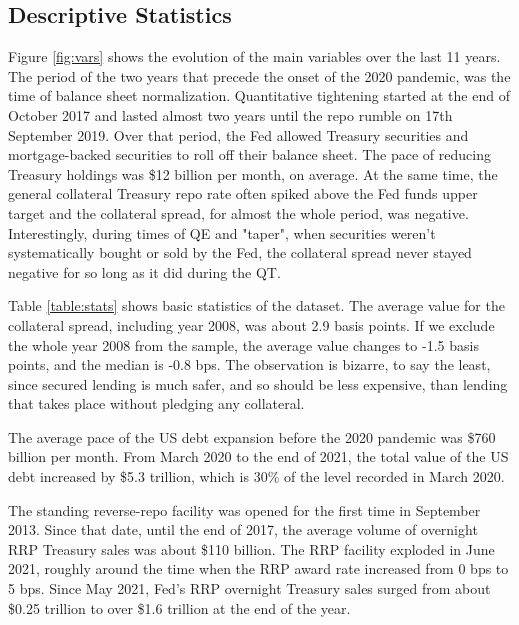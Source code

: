 \documentclass[11pt,a4paper,english,oneside]{article}
\begin{document}
\subsection{Descriptive Statistics} \label{sec:stats}

Figure \ref{fig:vars} shows the evolution of the main variables over the last 11 years. The period of the two years that precede the onset of the 2020 pandemic, was the time of balance sheet normalization. Quantitative tightening started at the end of October 2017 and lasted almost two years until the repo rumble on 17th September 2019. Over that period, the Fed allowed Treasury securities and mortgage-backed securities to roll off their balance sheet. The pace of reducing Treasury holdings was \$12 billion per month, on average. At the same time, the general collateral Treasury repo rate often spiked above the Fed funds upper target and the collateral spread, for almost the whole period, was negative. Interestingly, during times of QE and "taper", when securities weren't systematically bought or sold by the Fed, the collateral spread never stayed negative for so long as it did during the QT.

Table \ref{table:stats} shows basic statistics of the dataset. The average value for the collateral spread, including year 2008, was about 2.9 basis points. If we exclude the whole year 2008 from the sample, the average value changes to -1.5 basis points, and the median is -0.8 bps. The observation is bizarre, to say the least, since secured lending is much safer, and so should be less expensive, than lending that takes place without pledging any collateral.

The average pace of the US debt expansion before the 2020 pandemic was \$760 billion per month. From March 2020 to the end of 2021, the total value of the US debt increased by \$5.3 trillion, which is 30\% of the level recorded in March 2020.

The standing reverse-repo facility was opened for the first time in September 2013. Since that date, until the end of 2017, the average volume of overnight RRP Treasury sales was about \$110 billion. The RRP facility exploded in June 2021, roughly around the time when the RRP award rate increased from 0 bps to 5 bps. Since May 2021, Fed's RRP overnight Treasury sales surged from about \$0.25 trillion to over \$1.6 trillion at the end of the year.
\end{document}
